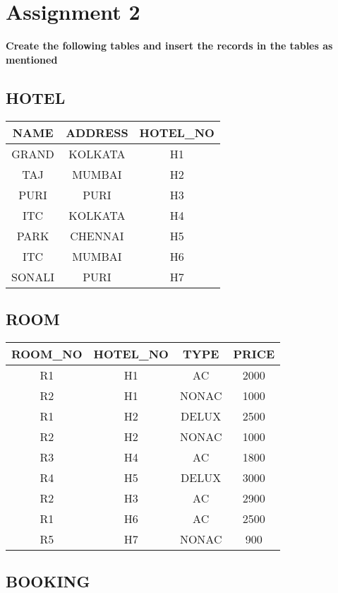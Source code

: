 \section{Assignment 2}

\textbf{Create the following tables and insert the records in the tables
as mentioned}

\subsection{HOTEL}\label{header-c24}

\begin{tabular}{|c|c|c|}
\hline
NAME & ADDRESS & HOTEL\_NO \\
\hline
GRAND & KOLKATA & H1 \\
TAJ & MUMBAI & H2 \\
PURI & PURI & H3 \\
ITC & KOLKATA & H4 \\
PARK & CHENNAI & H5 \\
ITC & MUMBAI & H6 \\
SONALI & PURI & H7 \\
\hline
\end{tabular}

\subsection{ROOM}\label{header-c58}

\begin{tabular}[]{|c|c|c|c|}
\hline
ROOM\_NO & HOTEL\_NO & TYPE & PRICE \\
\hline
R1 & H1 & AC & 2000 \\
R2 & H1 & NONAC & 1000 \\
R1 & H2 & DELUX & 2500 \\
R2 & H2 & NONAC & 1000 \\
R3 & H4 & AC & 1800 \\
R4 & H5 & DELUX & 3000 \\
R2 & H3 & AC & 2900 \\
R1 & H6 & AC & 2500 \\
R5 & H7 & NONAC & 900 \\
\hline
\end{tabular}

\subsection{BOOKING}\label{header-c110}


